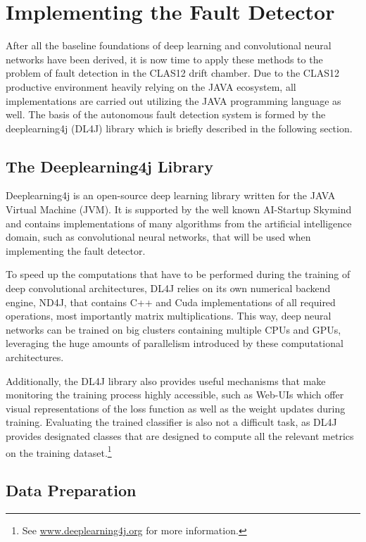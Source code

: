 \chapter{Implementing the Fault Detector}

After all the baseline foundations of deep learning and convolutional
neural networks have been derived, it is now time to apply these
methods to the problem of fault detection in the CLAS12 drift
chamber. Due to the CLAS12 productive environment heavily relying on
the JAVA ecosystem, all implementations are carried out utilizing
the JAVA programming language as well. The basis of the autonomous
fault detection system is formed by the deeplearning4j (DL4J)
library which is briefly described in the following section.

\section{The Deeplearning4j Library}

Deeplearning4j is an open-source deep learning library written for the
JAVA Virtual Machine (JVM). It is supported by the well known
AI-Startup Skymind and contains implementations of many algorithms
from the artificial intelligence domain, such as convolutional neural
networks, that will be used when implementing the fault detector.

To speed up the computations that have to be performed during the
training of deep convolutional architectures, DL4J relies on its own
numerical backend engine, ND4J, that contains C++ and Cuda
implementations of all required operations, most importantly matrix
multiplications. This way, deep neural networks can be trained on
big clusters containing multiple CPUs and GPUs, leveraging the huge
amounts of parallelism introduced by these computational
architectures.

Additionally, the DL4J library also provides useful mechanisms that
make monitoring the training process highly accessible, such as
Web-UIs which offer visual representations of the loss function as
well as the weight updates during training. Evaluating the trained
classifier is also not a difficult task, as DL4J provides
designated classes that are designed to compute all the relevant
metrics on the training dataset.\footnote{See
  \url{www.deeplearning4j.org} for more information.}

\section{Data Preparation}

